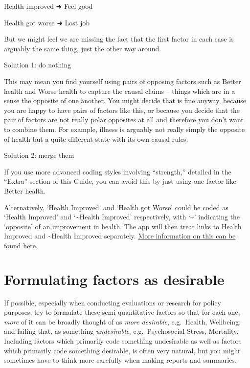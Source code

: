 \documentclass[
]{book}
\begin{document}
Health improved ➜ Feel good

Health got worse ➜ Lost job

But we might feel we are missing the fact that the first factor in each case is arguably the same thing, just the other way around.

Solution 1: do nothing

This may mean you find yourself using pairs of opposing factors such as Better health and Worse health to capture the causal claims -- things which are in a sense the opposite of one another. You might decide that is fine anyway, because you are happy to have pairs of factors like this, or because you decide that the pair of factors are not really polar opposites at all and therefore you don't want to combine them. For example, illness is arguably not really simply the opposite of health but a quite different state with its own causal rules.

Solution 2: merge them

If you use more advanced coding styles involving ``strength,'' detailed in the ``Extra'' section of this Guide, you can avoid this by just using one factor like Better health.

Alternatively, `Health Improved' and `Health got Worse' could be coded as `Health Improved' and `\textasciitilde Health Improved' respectively, with `\textasciitilde{}' indicating the `opposite' of an improvement in health. The app will then treat links to Health Improved and \textasciitilde Health Improved separately. \href{https://guide.causalmap.app/coding-opposites.html\#combining-opposites}{More information on this can be found here.}

\hypertarget{formulating-factors-as-desirable}{%
\section{Formulating factors as desirable}\label{formulating-factors-as-desirable}}

If possible, especially when conducting evaluations or research for policy purposes, try to formulate these semi-quantitative factors so that for each one, \emph{more} of it can be broadly thought of as \emph{more desirable}, e.g.~Health, Wellbeing; and failing that, as something \emph{undesirable}, e.g.~Psychosocial Stress, Mortality. Including factors which primarily code something undesirable as well as factors which primarily code something desirable, is often very natural, but you might sometimes have to think more carefully when making reports and summaries.
\end{document}

